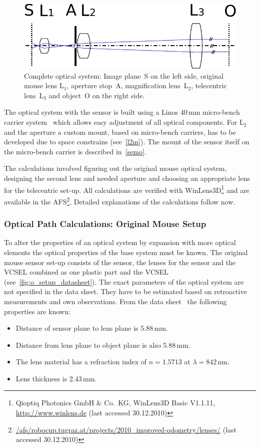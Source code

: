 \documentclass[12pt,a4paper]{article}
\begin{document}
\begin{figure}[htbp]
\begin{center}
\includegraphics[width=1\columnwidth]{figures/sketch-optic-simple}
\caption{\label{fig:sketch-optic-simple}
Complete optical system:
Image plane~S on the left side,
original mouse lens L$_1$,
aperture stop~A,
magnification lens~L$_2$,
telecentric lens~L$_3$ and object~O on the right side.
}
\end{center}
\end{figure}

The optical system with the sensor is built using a Linos 40\,mm micro-bench carrier system~\cite{microbench} which allows easy adjustment of all optical components.
For L$_2$ and the aperture a custom mount, based on micro-bench carriers, has to be developed due to space constrains (see~\autoref{l2m}).
The mount of the sensor itself on the micro-bench carrier is described in~\autoref{semo}.

The calculations involved figuring out the original mouse optical system, designing the second lens and needed aperture and choosing an appropriate lens for the telecentric set-up.
All calculations are verified with WinLens3D\footnote{Qioptiq Photonics GmbH \& Co.\ KG, WinLens3D Basic V1.1.11, \url{http://www.winlens.de} (last accessed 30.12.2010)} and are available in the AFS\footnote{\url{/afs/robocup.tugraz.at/projects/2010_improved-odometry/lenses/} (last accessed 30.12.2010)}.
Detailed explanations of the calculations follow now.

\subsubsection{Optical Path Calculations: Original Mouse Setup}

To alter the properties of an optical system by expansion with more optical elements the optical properties of the base system must be known.
The original mouse sensor set-up consists of the sensor, the lenses for the sensor and the VCSEL combined as one plastic part and the VCSEL (see~\autoref{fig:o_setup_datasheet}).
The exact parameters of the optical system are not specified in the data sheet.
They have to be estimated based on retroactive measurements and own observations.
From the data sheet~\cite{adns} the following properties are known: 
\begin{itemize}
  \item Distance of sensor plane to lens plane is 5.88\,mm.
  \item Distance from lens plane to object plane is also 5.88\,mm.
  \item The lens material has a refraction index of $n=1.5713$ at $\lambda=842$\,nm.
  \item Lens thickness is 2.43\,mm.
\end{itemize}
\end{document}
